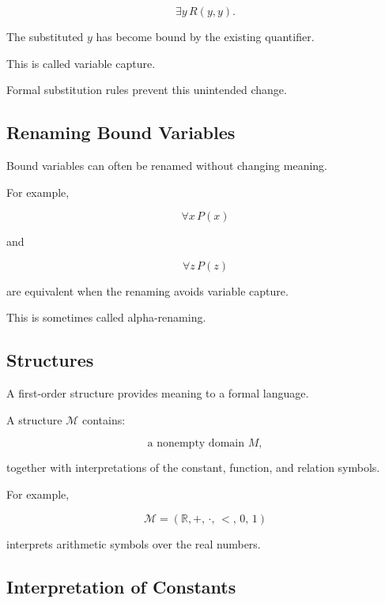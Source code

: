 \[
\exists y\,R(y,y).
\]

The substituted \(y\) has become bound by the existing quantifier.

This is called variable capture.

Formal substitution rules prevent this unintended change.

\subsection{Renaming Bound Variables}
\label{subsec:renaming-bound-variables}

Bound variables can often be renamed without changing meaning.

For example,

\[
\boxed{
\forall x\,P(x)
}
\]

and

\[
\boxed{
\forall z\,P(z)
}
\]

are equivalent when the renaming avoids variable capture.

This is sometimes called alpha-renaming.

\subsection{Structures}
\label{subsec:first-order-structures}

A first-order structure provides meaning to a formal language.

A structure \(\mathcal{M}\) contains:

\[
\boxed{
\text{a nonempty domain }M,
}
\]

together with interpretations of the constant, function, and relation
symbols.

For example,

\[
\boxed{
\mathcal{M}
=
(\mathbb{R},+,\,\cdot,\,<,\,0,\,1)
}
\]

interprets arithmetic symbols over the real numbers.

\subsection{Interpretation of Constants}
\label{subsec:interpretation-constants}

